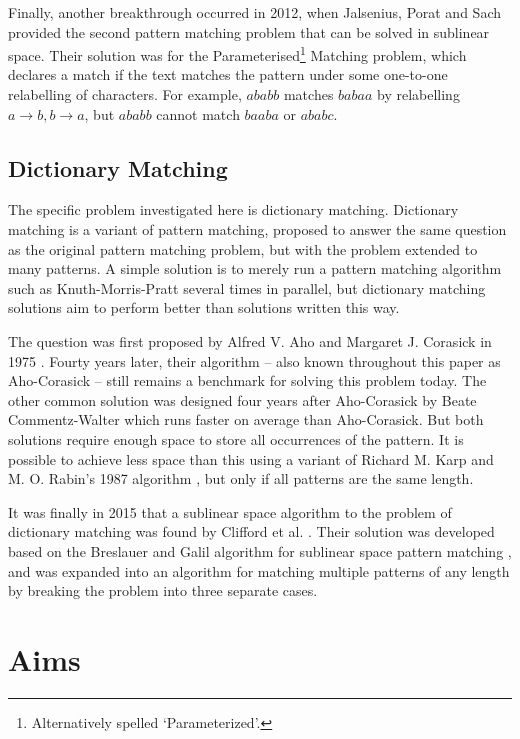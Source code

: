 \documentclass[ %
                    author={Dominic Joseph Moylett},
                    degree={MEng},
                     title={Dictionary Matching with Fingerprints},
                  subtitle={An Empirical Analysis},
                      type={research},
                      year={2015} ]{dissertation}
\begin{document}
Finally, another breakthrough occurred in 2012, when Jalsenius, Porat and Sach \cite{JPS:2013} provided the second pattern matching problem that can be solved in sublinear space. Their solution was for the Parameterised\footnote{Alternatively spelled `Parameterized'.} Matching problem, which declares a match if the text matches the pattern under some one-to-one relabelling of characters. For example, $ababb$ matches $babaa$ by relabelling $a \to b, b \to a$, but $ababb$ cannot match $baaba$ or $ababc$.

\subsection{Dictionary Matching}

The specific problem investigated here is dictionary matching. Dictionary matching is a variant of pattern matching, proposed to answer the same question as the original pattern matching problem, but with the problem extended to many patterns. A simple solution is to merely run a pattern matching algorithm such as Knuth-Morris-Pratt several times in parallel, but dictionary matching solutions aim to perform better than solutions written this way.

The question was first proposed by Alfred V. Aho and Margaret J. Corasick in 1975 \cite{Aho:1975:ESM:360825.360855}. Fourty years later, their algorithm -- also known throughout this paper as Aho-Corasick -- still remains a benchmark for solving this problem today. The other common solution was designed four years after Aho-Corasick by Beate Commentz-Walter \cite{commentz-walter:algo} which runs faster on average than Aho-Corasick. But both solutions require enough space to store all occurrences of the pattern. It is possible to achieve less space than this using a variant of Richard M. Karp and M. O. Rabin's 1987 algorithm \cite{5390135}, but only if all patterns are the same length.

It was finally in 2015 that a sublinear space algorithm to the problem of dictionary matching was found by Clifford et al. \cite{2015arXiv150406242C}. Their solution was developed based on the Breslauer and Galil algorithm for sublinear space pattern matching \cite{Breslauer:2014:RSS:2660854.2635814}, and was expanded into an algorithm for matching multiple patterns of any length by breaking the problem into three separate cases.

\section{Aims}
\end{document}
